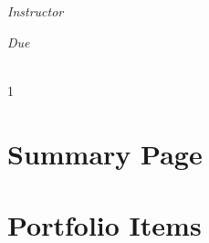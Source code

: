 \documentclass[12pt, oneside]{book}
\begin{document}
\begin{titlepage}
\begin{center}
\begin{large}
            \vspace*{1\baselineskip}

            \textit{Instructor} \\[1ex] %
            \professor

            \vspace*{1\baselineskip}

            \textit{Due}\\[1ex]
            {\scshape  \finaldate} \\[0.3\baselineskip] %

            \thispagestyle{empty}

        \end{large}
    \end{center}
\end{titlepage}
\pagebreak






\begin{spacing}{1} %
    \renewcommand{\contentsname}{\Large\textbf{Table of Contents}} %
    \markboth{}{} %
    \pagestyle{fancy} %
    \tableofcontents
\end{spacing}




\chapter{Summary Page}\label{summary}
\vspace*{-0.25in}

\setcounter{chapter}{1}

\chapter{Portfolio Items}
\vspace*{-0.25in}

\setcounter{chapter}{2}
\end{document}
